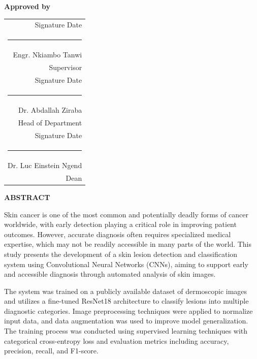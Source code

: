 \begin{flushright}
\textbf{Approved by}

\vspace{1.5cm}

\begin{tabular}{@{}r@{}}
Signature \hspace{3cm} Date \\ [0.5cm]
\rule{6cm}{0.15mm} \\ [0.2cm]
Engr. Nkiambo Tanwi \\ [0.3cm]
Supervisor \\[1cm]

Signature \hspace{3cm} Date \\ [0.5cm]
\rule{6cm}{0.15mm} \\ [0.2cm]
Dr. Abdallah Ziraba \\ [0.3cm]
Head of Department \\[1cm]

Signature \hspace{3cm} Date \\ [0.5cm]
\rule{6cm}{0.15mm} \\ [0.2cm]
Dr. Luc Einstein Ngend \\ [0.3cm]
Dean \\
\end{tabular}
\end{flushright}

\vfill
\clearpage

\thispagestyle{empty}
\begin{center}
\textbf{\Large ABSTRACT}
\end{center}

\vspace{1cm}

Skin cancer is one of the most common and potentially deadly forms of cancer worldwide, with early detection playing a critical role in improving patient outcomes. However, accurate diagnosis often requires specialized medical expertise, which may not be readily accessible in many parts of the world. This study presents the development of a skin lesion detection and classification system using Convolutional Neural Networks (CNNs), aiming to support early and accessible diagnosis through automated analysis of skin images.

The system was trained on a publicly available dataset of dermoscopic images and utilizes a fine-tuned ResNet18 architecture to classify lesions into multiple diagnostic categories. Image preprocessing techniques were applied to normalize input data, and data augmentation was used to improve model generalization. The training process was conducted using supervised learning techniques with categorical cross-entropy loss and evaluation metrics including accuracy, precision, recall, and F1-score.

